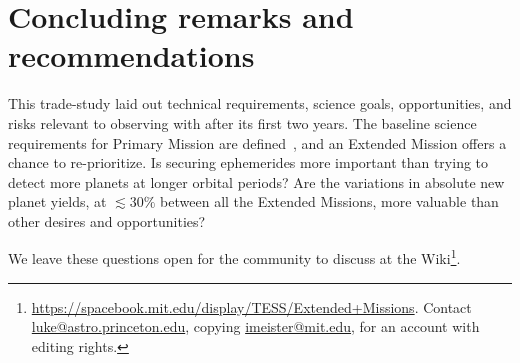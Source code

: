 \section{Concluding remarks and recommendations}
\label{sec:conclusions}

This trade-study laid out technical requirements, science goals, opportunities, and risks relevant to observing with \tess after its first two years.
The baseline science requirements for \tesss Primary Mission are defined~\citep{ricker_transiting_2014}, and an Extended Mission offers a chance to re-prioritize.
Is securing \tesss ephemerides more important than trying to detect more
planets at longer orbital periods? 
Are the variations in absolute new planet yields, at $\lesssim30\%$ between all the Extended Missions, more valuable than other desires and opportunities?

We leave these questions open for the community to discuss at the \tess Wiki\footnote{\url{https://spacebook.mit.edu/display/TESS/Extended+Missions}. Contact \url{luke@astro.princeton.edu}, copying \url{imeister@mit.edu}, for an account with editing rights.}.


